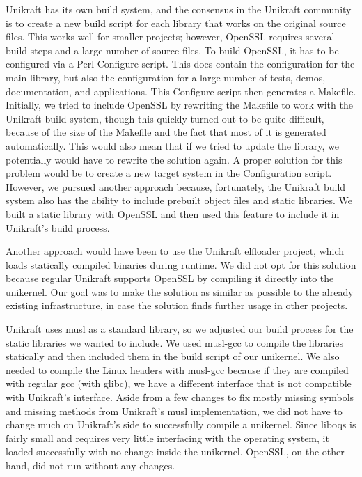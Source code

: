 \documentclass[public,noindent]{aisecreport}
\begin{document}
Unikraft has its own build system, and the consensus in the Unikraft community is to create a new build script for each library that works on the original source files. This works well for smaller projects; however, OpenSSL requires several build steps and a large number of source files. To build OpenSSL, it has to be configured via a Perl Configure script. This does contain the configuration for the main library, but also the configuration for a large number of tests, demos, documentation, and applications. This Configure script then generates a Makefile. Initially, we tried to include OpenSSL by rewriting the Makefile to work with the Unikraft build system, though this quickly turned out to be quite difficult, because of the size of the Makefile and the fact that most of it is generated automatically. This would also mean that if we tried to update the library, we potentially would have to rewrite the solution again. A proper solution for this problem would be to create a new target system in the Configuration script. However, we pursued another approach because, fortunately, the Unikraft build system also has the ability to include prebuilt object files and static libraries. We built a static library with OpenSSL and then used this feature to include it in Unikraft's build process. 

Another approach would have been to use the Unikraft elfloader project, which loads statically compiled binaries during runtime. We did not opt for this solution because regular Unikraft supports OpenSSL by compiling it directly into the unikernel. Our goal was to make the solution as similar as possible to the already existing infrastructure, in case the solution finds further usage in other projects.

Unikraft uses musl as a standard library, so we adjusted our build process for the static libraries we wanted to include. We used musl-gcc to compile the libraries statically and then included them in the build script of our unikernel. We also needed to compile the Linux headers with musl-gcc because if they are compiled with regular gcc (with glibc), we have a different interface that is not compatible with Unikraft's interface. Aside from a few changes to fix mostly missing symbols and missing methods from Unikraft's musl implementation, we did not have to change much on Unikraft's side to successfully compile a unikernel. Since liboqs is fairly small and requires very little interfacing with the operating system, it loaded successfully with no change inside the unikernel. OpenSSL, on the other hand, did not run without any changes. 
\end{document}
